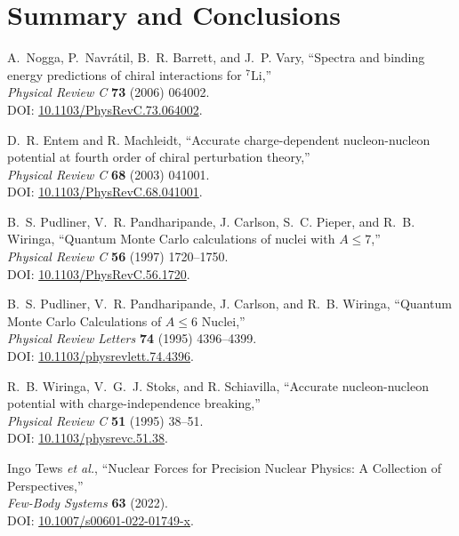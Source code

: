 \documentclass[12pt]{article}
\newcommand{\3}{\ss}
\numberwithin{equation}{section}
\begin{document}
  \section{Summary and Conclusions}
\begin{thebibliography}{44}

A.~Nogga, P.~Navrátil, B.~R. Barrett, and J.~P. Vary, 
``Spectra and binding energy predictions of chiral interactions for ${}^7\mathrm{Li}$,''\\ 
\textit{Physical Review C} \textbf{73} (2006) 064002.\\ 
DOI: \href{http://dx.doi.org/10.1103/PhysRevC.73.064002}{10.1103/PhysRevC.73.064002}.

D.~R. Entem and R. Machleidt, 
``Accurate charge-dependent nucleon-nucleon potential at fourth order of chiral perturbation theory,''\\ 
\textit{Physical Review C} \textbf{68} (2003) 041001.\\ 
DOI: \href{http://dx.doi.org/10.1103/PhysRevC.68.041001}{10.1103/PhysRevC.68.041001}.

B.~S. Pudliner, V.~R. Pandharipande, J. Carlson, S.~C. Pieper, and R.~B. Wiringa, 
``Quantum Monte Carlo calculations of nuclei with $A\leq7$,''\\ 
\textit{Physical Review C} \textbf{56} (1997) 1720–1750.\\ 
DOI: \href{http://dx.doi.org/10.1103/PhysRevC.56.1720}{10.1103/PhysRevC.56.1720}.

B.~S. Pudliner, V.~R. Pandharipande, J. Carlson, and R.~B. Wiringa, 
``Quantum Monte Carlo Calculations of $A\leq6$ Nuclei,''\\ 
\textit{Physical Review Letters} \textbf{74} (1995) 4396–4399.\\ 
DOI: \href{http://dx.doi.org/10.1103/physrevlett.74.4396}{10.1103/physrevlett.74.4396}.

R.~B. Wiringa, V.~G.~J. Stoks, and R. Schiavilla, 
``Accurate nucleon-nucleon potential with charge-independence breaking,''\\ 
\textit{Physical Review C} \textbf{51} (1995) 38–51.\\ 
DOI: \href{http://dx.doi.org/10.1103/physrevc.51.38}{10.1103/physrevc.51.38}.

Ingo Tews \textit{et al.}, 
``Nuclear Forces for Precision Nuclear Physics: A Collection of Perspectives,''\\ 
\textit{Few-Body Systems} \textbf{63} (2022).\\ 
DOI: \href{http://dx.doi.org/10.1007/s00601-022-01749-x}{10.1007/s00601-022-01749-x}.


\end{thebibliography}
\end{document}
